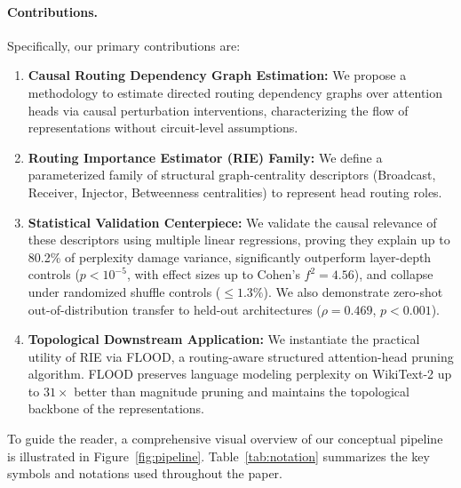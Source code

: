 \documentclass[11pt,a4paper]{article}
\theoremstyle{definition}
\theoremstyle{plain}
\begin{document}
\paragraph{Contributions.}
Specifically, our primary contributions are:
\begin{enumerate}
    \item \textbf{Causal Routing Dependency Graph Estimation:} We propose a methodology to estimate directed routing dependency graphs over attention heads via causal perturbation interventions, characterizing the flow of representations without circuit-level assumptions.
    \item \textbf{Routing Importance Estimator (RIE) Family:} We define a parameterized family of structural graph-centrality descriptors (Broadcast, Receiver, Injector, Betweenness centralities) to represent head routing roles.
    \item \textbf{Statistical Validation Centerpiece:} We validate the causal relevance of these descriptors using multiple linear regressions, proving they explain up to 80.2\% of perplexity damage variance, significantly outperform layer-depth controls ($p < 10^{-5}$, with effect sizes up to Cohen's $f^2 = 4.56$), and collapse under randomized shuffle controls ($\le 1.3\%$). We also demonstrate zero-shot out-of-distribution transfer to held-out architectures ($\rho = 0.469$, $p < 0.001$).
    \item \textbf{Topological Downstream Application:} We instantiate the practical utility of RIE via FLOOD, a routing-aware structured attention-head pruning algorithm. FLOOD preserves language modeling perplexity on WikiText-2 up to $31\times$ better than magnitude pruning and maintains the topological backbone of the representations.
\end{enumerate}

To guide the reader, a comprehensive visual overview of our conceptual pipeline is illustrated in Figure~\ref{fig:pipeline}. Table~\ref{tab:notation} summarizes the key symbols and notations used throughout the paper.
\end{document}
